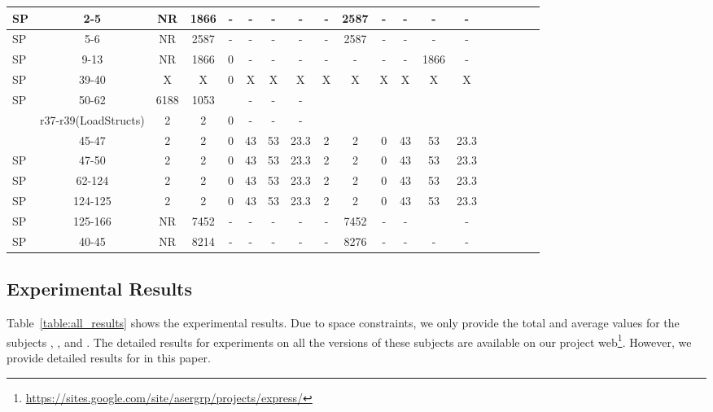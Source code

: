 \begin{table*}
\begin{CodeOut}
\begin{center}
\begin {tabular} {|l|c|c|c|c|c|c|c|c|c|c|c|c|c|c|c|c|c|c|}
\hline
SP&2-5&NR&1866&-&-&-&-&-&2587&-&-&-&-\\
\hline
SP&5-6&NR&2587&-&-&-&-&-&2587&-&-&-&-\\
\hline
SP&9-13&NR&1866&0&-&-&-&-&-&-&-&1866&-\\
\hline
SP&39-40&X&X&0&X&X&X&X&X&X&X&X&X\\
\hline
SP&50-62&6188&1053&&-&-&-&&&&&&\\
\hline
\Comment{SP&r37-r39(LoadStructs)&2&2&0&-&-&-&&&&&&\\
\hline}
SP&45-47&2&2&0&43&53&23.3&2&2&0&43&53&23.3\\
\hline
SP&47-50&2&2&0&43&53&23.3&2&2&0&43&53&23.3\\
\hline
SP&62-124&2&2&0&43&53&23.3&2&2&0&43&53&23.3\\
\hline
SP&124-125&2&2&0&43&53&23.3&2&2&0&43&53&23.3\\
\hline
SP&125-166&NR&7452&-&-&-&-&-&7452&-&-&&-\\
\hline
SP&40-45&NR&8214&-&-&-&-&-&8276&-&-&-&-\\
\hline
\end{tabular}
\end{center}
\end{CodeOut}
\vspace{- 0.35 in}
\end{table*}


\subsection{Experimental Results}
Table~\ref{table:all_results} shows the experimental results. Due to space constraints, we only provide the total and average values for the subjects , , and . The detailed results for experiments on all the versions of these subjects are available on our project web\footnote{\url{https://sites.google.com/site/asergrp/projects/express/}}.
However, we provide detailed results for  in this paper. 

